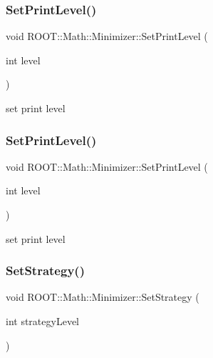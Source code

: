 \subsubsection{\texorpdfstring{SetPrintLevel()}{SetPrintLevel()}\hspace{0.1cm}{\footnotesize\ttfamily [2/3]}}
{\footnotesize\ttfamily void R\+O\+O\+T\+::\+Math\+::\+Minimizer\+::\+Set\+Print\+Level (\begin{DoxyParamCaption}\item[{int}]{level }\end{DoxyParamCaption})\hspace{0.3cm}{\ttfamily [inline]}}



set print level 

\mbox{\label{classROOT_1_1Math_1_1Minimizer_a726ee3c159360784a2d76f0b9e9594a6}} 
\subsubsection{\texorpdfstring{SetPrintLevel()}{SetPrintLevel()}\hspace{0.1cm}{\footnotesize\ttfamily [3/3]}}
{\footnotesize\ttfamily void R\+O\+O\+T\+::\+Math\+::\+Minimizer\+::\+Set\+Print\+Level (\begin{DoxyParamCaption}\item[{int}]{level }\end{DoxyParamCaption})\hspace{0.3cm}{\ttfamily [inline]}}



set print level 

\mbox{\label{classROOT_1_1Math_1_1Minimizer_a86a1145e00a7912ac061bad0e11b6c0b}} 
\subsubsection{\texorpdfstring{SetStrategy()}{SetStrategy()}\hspace{0.1cm}{\footnotesize\ttfamily [1/3]}}
{\footnotesize\ttfamily void R\+O\+O\+T\+::\+Math\+::\+Minimizer\+::\+Set\+Strategy (\begin{DoxyParamCaption}\item[{int}]{strategy\+Level }\end{DoxyParamCaption})\hspace{0.3cm}{\ttfamily [inline]}}



